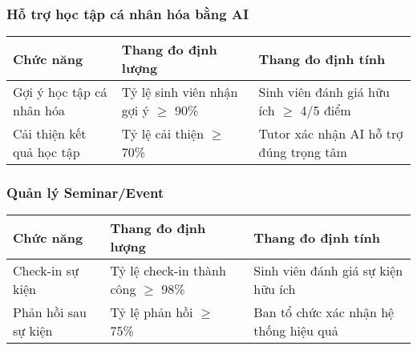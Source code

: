 \vspace{1em}
\subsubsection*{Hỗ trợ học tập cá nhân hóa bằng AI}
\begin{tabular}{|p{4cm}|p{5cm}|p{4cm}|}
\hline
\textbf{Chức năng} & \textbf{Thang đo định lượng} & \textbf{Thang đo định tính} \\
\hline
Gợi ý học tập cá nhân hóa & Tỷ lệ sinh viên nhận gợi ý $\geq$ 90\% & Sinh viên đánh giá hữu ích $\geq$ 4/5 điểm \\
\hline
Cải thiện kết quả học tập & Tỷ lệ cải thiện $\geq$ 70\% & Tutor xác nhận AI hỗ trợ đúng trọng tâm \\
\hline
\end{tabular}

\vspace{1em}
\subsubsection*{Quản lý Seminar/Event}
\begin{tabular}{|p{4cm}|p{5cm}|p{4cm}|}
\hline
\textbf{Chức năng} & \textbf{Thang đo định lượng} & \textbf{Thang đo định tính} \\
\hline
Check-in sự kiện & Tỷ lệ check-in thành công $\geq$ 98\% & Sinh viên đánh giá sự kiện hữu ích \\
\hline
Phản hồi sau sự kiện & Tỷ lệ phản hồi $\geq$ 75\% & Ban tổ chức xác nhận hệ thống hiệu quả \\
\hline
\end{tabular}